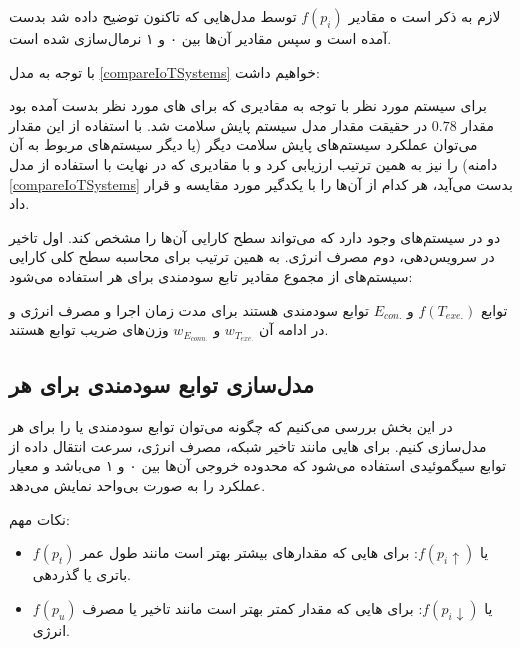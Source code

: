 لازم به ذکر است ه مقادیر $f(p_i)$ توسط مدل‌هایی که تاکنون توضیح داده شد بدست
آمده است و سپس مقادیر آن‌ها بین ۰ و ۱ نرمال‌سازی شده است.

با توجه به مدل \ref{compareIoTSystems} خواهیم داشت:


برای سیستم مورد نظر با توجه به مقادیری که برای های مورد نظر بدست آمده
بود مقدار $0.78$ در حقیقت مقدار مدل سیستم پایش سلامت شد. با استفاده از این مقدار
می‌توان عملکرد سیستم‌های پایش سلامت دیگر (یا دیگر سیستم‌های  مربوط به آن
دامنه) را نیز به همین ترتیب ارزیابی کرد و با مقادیری که در نهایت با استفاده از
مدل \ref{compareIoTSystems} بدست می‌آید، هر کدام از آن‌ها را با یکدگیر مورد
مقایسه و  قرار داد.

دو  در سیستم‌های  وجود دارد که می‌تواند سطح کارایی آن‌ها را مشخص
کند. اول تاخیر در سرویس‌دهی، دوم مصرف انرژی. به همین ترتیب برای محاسبه سطح کلی
کارایی سیستم‌های  از مجموع مقادیر تابع سودمندی برای هر 
استفاده می‌شود:


توابع $f(T_{exe.})$ و $E_{con.}$ توابع سودمندی هستند برای مدت زمان اجرا و
مصرف انرژی و در ادامه آن $w_{T_{exe.}}$ و $w_{E_{conn.}}$ وزن‌های ضریب توابع
هستند.

\subsection{مدل‌سازی توابع سودمندی برای هر }

در این بخش بررسی می‌کنیم که چگونه می‌توان توابع سودمندی یا  را برای هر  مدل‌سازی کنیم. برای هایی مانند تاخیر
شبکه، مصرف انرژی، سرعت انتقال داده از توابع سیگموئیدی استفاده می‌شود که محدوده
خروجی آن‌ها بین ۰ و ۱ می‌باشد و معیار عملکرد  را به صورت بی‌واحد نمایش
می‌دهد.

نکات مهم:

\begin{itemize}
    \item $f(p_t)$ یا $f(p_i \uparrow)$: برای هایی که مقدار‌‌های بیشتر
    بهتر است مانند طول عمر باتری یا گذردهی.
    \item $f(p_u)$ یا $f(p_i \downarrow)$: برای هایی که مقدار کمتر بهتر
    است مانند تاخیر یا مصرف انرژی.
\end{itemize}

